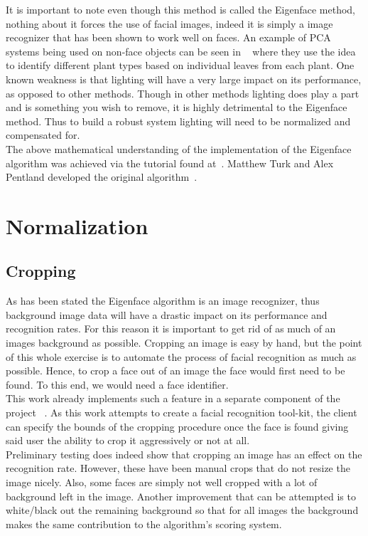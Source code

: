 			It is important to note even though this method is called the Eigenface method, nothing about 
			it forces the use of facial images, indeed it is simply a image recognizer that has been shown 
			to work well on faces.  An example of PCA systems being used on non-face objects can be seen in
			~\cite{plantClassification} where they use the idea to identify different plant types based on 
			individual leaves from each plant.  One known weakness is that lighting will have a very large 
			impact on its performance, as opposed to other methods.  Though in other methods lighting does 
			play a part and is something you wish to remove, it is highly detrimental to the Eigenface method. 
			Thus to build a robust system lighting will need to be normalized and compensated for. \\
		
			The above mathematical understanding of the implementation of the Eigenface algorithm was 
			achieved via the tutorial found at~\cite{urlEgienFaceTut}.  Matthew Turk and Alex Pentland 
			developed the original algorithm~\cite{turk1991eigenfaces}.

	\section{Normalization}
		\subsection{Cropping}
		As has been stated the Eigenface algorithm is an image recognizer, thus background image 
		data will have a drastic impact on its performance and recognition rates.  For this reason 
		it is important to get rid of as much of an images background as possible.  
		Cropping an image is easy by hand, but the point of this whole exercise is to automate 
		the process of facial recognition as much as possible.  Hence, to crop a face out 
		of an image the face would first need to be found.  To this end, we would need a face 
		identifier. \\
		
		This work already implements such a feature in a separate component of the project ~\cite{MarceloFIFLA}.  
		As this work attempts to create a facial recognition tool-kit, the client can specify the bounds 
		of the cropping procedure once the face is found giving said user the ability to crop it 
		aggressively or not at all. \\
		
		Preliminary testing does indeed show that cropping an image has an effect on the recognition 
		rate.  However, these have been manual crops that do not resize the image nicely.  Also, some 
		faces are simply not well cropped with a lot of background left in the image.  Another improvement 
		that can be attempted is to white/black out the remaining background so that for all images the 
		background makes the same contribution to the algorithm's scoring system. 
		
